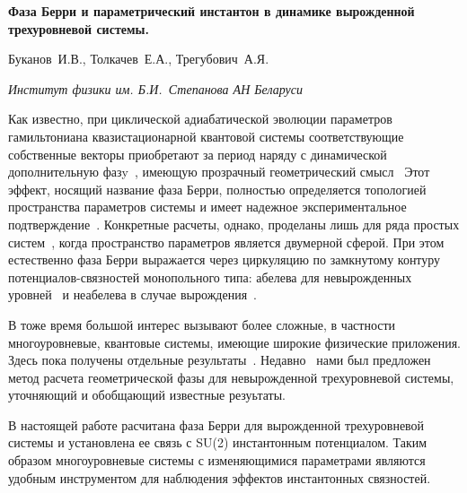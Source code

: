 \documentclass[a4paper]{article}
\begin{document}
\begin{center}

{\large\bf Фаза Берри и параметрический инстантон в динамике вырожденной
трехуровневой системы. }

Буканов~И.В., Толкачев~Е.А., Трегубович~А.Я.

{\it Институт физики им. Б.И.~Степанова АН Беларуси}

\end{center}

\begin{abstract}
  Построены замкнутые выражения, позволяющие вычислить фазу Берри,
возникающую при динамической эволюции параметров вырожденной
трехуровневой квантовой системы и показано, что соответствующий
неабелев потенциал в пространстве параметров несет единичный
топологический заряд и имеет ассимтоматику обычного инстантонна.
\end{abstract}


Как известно, при циклической адиабатической эволюции параметров
гамильтониана квазистационарной квантовой системы соответствующие
собственные векторы приобретают за период наряду с динамической
дополнительную фазy~\cite{FirstBerryWork,AllBerryPhase},
имеющую прозрачный геометрический смысл~\cite{SimonWork}
Этот эффект, носящий название фаза Берри, полностью
определяется топологией пространства параметров системы и имеет надежное
экспериментальное подтверждение~\cite{BerryPhaseExperimentalTest}.
Конкретные расчеты, однако, проделаны
лишь для ряда простых систем~\cite{WorkAboutSimpleSystem},
когда пространство параметров является
двумерной сферой. При этом естественно фаза Берри выражается через
циркуляцию по замкнутому контуру потенциалов-связностей монопольного типа:
абелева для невырожденных уровней~\cite{FirstBerryWork}
и неабелева в случае
вырождения~\cite{WilczekZeeWork}.

В тоже время большой интерес вызывают более сложные, в частности
многоуровневые, квантовые системы, имеющие широкие физические приложения.
Здесь пока получены отдельные
результаты~\cite{CeulemansWork,KorenblitWork}.
Недавно~\cite{PreviousWork} нами был
предложен метод расчета геометрической фазы для невырожденной трехуровневой
системы, уточняющий и обобщающий известные резуьтаты.

В настоящей работе расчитана фаза Берри для вырожденной трехуровневой
системы и установлена ее связь с SU(2) инстантонным потенциалом. Таким
образом многоуровневые системы с изменяющимися параметрами являются удобным
инструментом для наблюдения эффектов инстантонных связностей.
\end{document}
